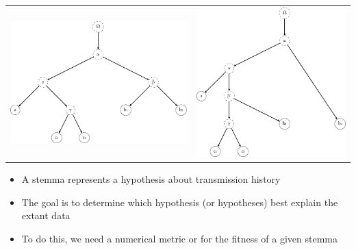 \documentclass[10pt]{beamer}
\begin{document}
	\begin{frame}
		\begin{tabular}{p{} @{\hskip 0.2\textwidth} p{}}
			\vspace{0pt}\includegraphics[scale=0.4]{../img/gene-tree-rooted-site-1.pdf} & \vspace{0pt}\includegraphics[scale=0.4]{../img/gene-tree-rooted-site-2.pdf}
		\end{tabular}
		\begin{itemize}
			\item A stemma represents a hypothesis about transmission history
			\item The goal is to determine which hypothesis (or hypotheses) best explain the extant data
			\item To do this, we need a numerical metric or  for the fitness of a given stemma
		\end{itemize}
	\end{frame}
\end{document}
